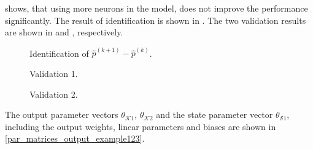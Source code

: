   shows, that using more neurons in the model, does not improve the performance significantly. The result of identification is shown in . The two validation results are shown in  and , respectively. 

 \begin{figure}[H]
 \centering
  
 \vspace{-3.5mm}
 \caption{Identification of $\hat{p}^{(k+1)} - \hat{p}^{(k)}$.}
 \label{fig:p_WT_ident}
 \end{figure}

 \vspace{-4mm}

 \begin{figure}[H]
 \centering
  
 \vspace{-3.5mm}
 \caption{Validation 1.}
 \label{fig:p_WT_ident_v1}
 \end{figure}

 \vspace{-4mm}

 \begin{figure}[H]
 \centering
 \hspace{6mm}
  
 \vspace{-2.5mm}
 \caption{Validation 2.}
 \label{fig:p_WT_ident_v2}
 \end{figure}

 \vspace{-4mm}

The output parameter vectors $\theta_{\mathcal{K}1}$, $\theta_{\mathcal{K}2}$ and the state parameter vector $\theta_{\mathcal{S}1}$, including the output weights, linear parameters and biases are shown in \eqref{par_matrices_output_example123}.

\vspace{-2mm}

